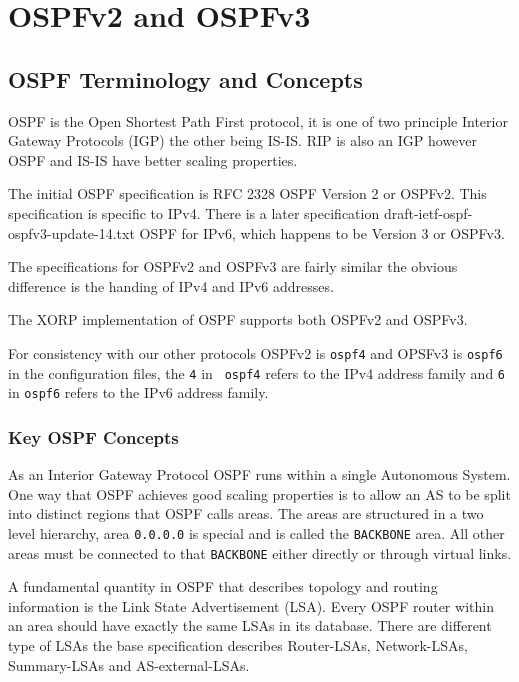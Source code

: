 %
% 

\chapter{OSPFv2 and OSPFv3}
\label{ospf}
\section{OSPF Terminology and Concepts}

OSPF is the Open Shortest Path First protocol, it is one of two
principle Interior Gateway Protocols (IGP) the other being IS-IS. RIP
is also an IGP however OSPF and IS-IS have better scaling properties.

The initial OSPF specification is RFC 2328 OSPF Version 2 or
OSPFv2. This specification is specific to IPv4. There is a later
specification draft-ietf-ospf-ospfv3-update-14.txt OSPF for IPv6,
which happens to be Version 3 or OSPFv3.

The specifications for OSPFv2 and OSPFv3 are fairly similar the
obvious difference is the handing of IPv4 and IPv6 addresses.

The XORP implementation of OSPF supports both OSPFv2 and OSPFv3.

For consistency with our other protocols OSPFv2 is {\tt ospf4} and
OPSFv3 is {\tt ospf6} in the configuration files, the {\tt 4} in {\tt
ospf4} refers to the IPv4 address family and {\tt 6} in {\tt ospf6}
refers to the IPv6 address family.

\subsection{Key OSPF Concepts}

As an Interior Gateway Protocol OSPF runs within a single Autonomous
System. One way that OSPF achieves good scaling properties is to allow
an AS to be split into distinct regions that OSPF calls areas. The areas
are structured in a two level hierarchy, area {\tt 0.0.0.0} is special
and is called the {\tt BACKBONE} area. All other areas must be
connected to that {\tt BACKBONE} either directly or through virtual links.

A fundamental quantity in OSPF that describes topology and routing
information is the Link State Advertisement (LSA). Every OSPF router
within an area should have exactly the same LSAs in its
database. There are different type of LSAs the base specification
describes Router-LSAs, Network-LSAs, Summary-LSAs and AS-external-LSAs.


